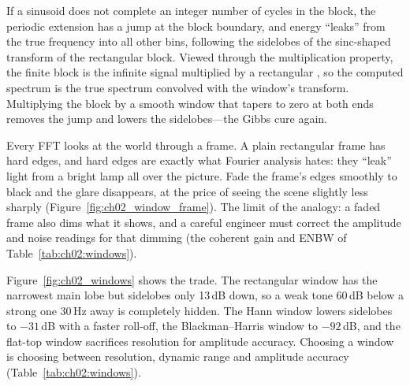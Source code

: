 If a sinusoid does not complete an integer number of cycles in the block, the periodic
extension has a jump at the block boundary, and energy ``leaks'' from the true frequency into
all other bins, following the sidelobes of the sinc-shaped transform of the rectangular
block. Viewed through the multiplication property, the finite block is the infinite signal
multiplied by a rectangular , so the computed spectrum is the true spectrum
convolved with the window's transform. Multiplying the block by a smooth window that tapers to zero
at both ends removes the jump and lowers the sidelobes---the Gibbs cure again.


\begin{analogy}
Every FFT looks at the world through a frame. A plain rectangular frame has hard edges, and hard
edges are exactly what Fourier analysis hates: they ``leak'' light from a bright lamp all over the
picture. Fade the frame's edges smoothly to black and the glare disappears, at the price of seeing
the scene slightly less sharply (Figure~\ref{fig:ch02_window_frame}). The limit of the analogy:
a faded frame also dims what it shows, and a careful engineer must correct the amplitude and noise
readings for that dimming (the coherent gain and ENBW of Table~\ref{tab:ch02:windows}).
\end{analogy}

Figure~\ref{fig:ch02_windows} shows the trade. The rectangular window has the narrowest main lobe
but sidelobes only 13\,dB down, so a weak tone 60\,dB below a strong one 30\,Hz away is completely
hidden. The Hann window lowers sidelobes to $-31$\,dB with a faster roll-off, the Blackman--Harris
window to $-92$\,dB, and the flat-top window sacrifices resolution for amplitude accuracy.
Choosing a window is choosing between resolution, dynamic range and amplitude accuracy
(Table~\ref{tab:ch02:windows}).


